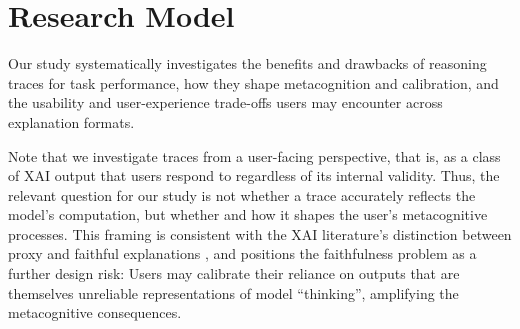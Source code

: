 \documentclass[acmlarge,review=true, anonymous=true]{acmart}
\begin{document}



\section{Research Model}

Our study systematically investigates the benefits and drawbacks of reasoning traces for task performance, how they shape metacognition and calibration, and the usability and user-experience trade-offs users may encounter across explanation formats.

Note that we investigate traces from a user-facing perspective, that is, as a class of XAI output that users respond to regardless of its internal validity. Thus, the relevant question for our study is not whether a trace accurately reflects the model's computation, but whether and how it shapes the user's metacognitive processes. This framing is consistent with the XAI literature's distinction between proxy and faithful explanations \cite{barez2025chain, jacovi-goldberg-2020-towards, 10.5555/3666122.3669397}, and positions the faithfulness problem as a further design risk: Users may calibrate their reliance on outputs that are themselves unreliable representations of model ``thinking'', amplifying the metacognitive consequences.
\end{document}

